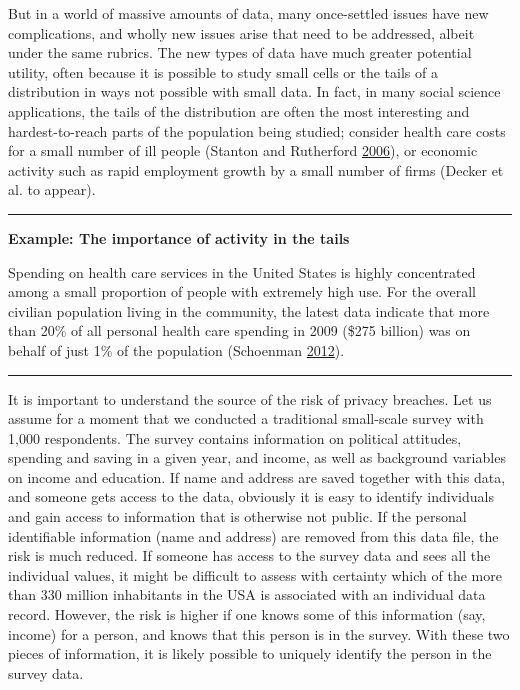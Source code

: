 \documentclass[]{krantz}
\begin{document}
But in a world of massive amounts of data, many once-settled issues have
new complications, and wholly new issues arise that need to be
addressed, albeit under the same rubrics. The new types of data have
much greater potential utility, often because it is possible to study
small cells or the tails of a distribution in ways not possible with
small data. In fact, in many social science applications, the tails of
the distribution are often the most interesting and hardest-to-reach
parts of the population being studied; consider health care costs for a
small number of ill people (Stanton and Rutherford
\protect\hyperlink{ref-stanton2006high}{2006}), or economic activity
such as rapid employment growth by a small number of firms (Decker et
al. to appear).

\begin{center}\rule{0.5\linewidth}{\linethickness}\end{center}

\textbf{Example: The importance of activity in the tails}

Spending on health care services in the United States is highly
concentrated among a small proportion of people with extremely high use.
For the overall civilian population living in the community, the latest
data indicate that more than 20\% of all personal health care spending
in 2009 (\$275 billion) was on behalf of just 1\% of the population
(Schoenman \protect\hyperlink{ref-healthcarespending}{2012}).

\begin{center}\rule{0.5\linewidth}{\linethickness}\end{center}

It is important to understand the source of the risk of privacy
breaches. Let us assume for a moment that we conducted a traditional
small-scale survey with 1,000 respondents. The survey contains
information on political attitudes, spending and saving in a given year,
and income, as well as background variables on income and education. If
name and address are saved together with this data, and someone gets
access to the data, obviously it is easy to identify individuals and
gain access to information that is otherwise not public. If the personal
identifiable information (name and address) are removed from this data
file, the risk is much reduced. If someone has access to the survey data
and sees all the individual values, it might be difficult to assess with
certainty which of the more than 330 million inhabitants in the USA is
associated with an individual data record. However, the risk is higher
if one knows some of this information (say, income) for a person, and
knows that this person is in the survey. With these two pieces of
information, it is likely possible to uniquely identify the person in
the survey data.
\end{document}

